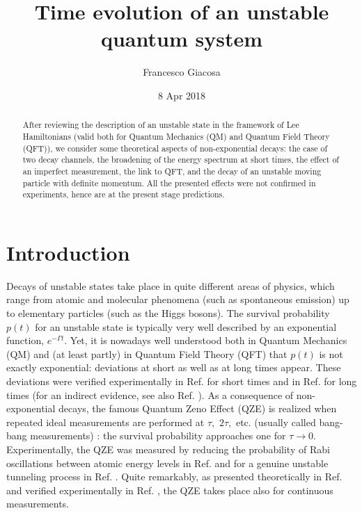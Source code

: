 \documentclass[12pt]{article}%
\begin{document}
\title{Time evolution of an unstable quantum system}
\author{Francesco Giacosa}
\date{8 Apr 2018}
\maketitle

\begin{abstract}
After reviewing the description of an unstable state in the framework of Lee
Hamiltonians (valid both for Quantum Mechanics (QM) and Quantum Field Theory
(QFT)), we consider some theoretical aspects of non-exponential decays: the
case of two decay channels, the broadening of the energy spectrum at short
times, the effect of an imperfect measurement, the link to QFT, and the decay
of an unstable moving particle with definite momentum. All the presented
effects were not confirmed in experiments, hence are at the present stage predictions.

\end{abstract}



\section{Introduction}

Decays of unstable states take place in quite different areas of physics,
which range from atomic and molecular phenomena (such as spontaneous emission)
up to elementary particles (such as the Higgs bosons). The survival
probability $p(t)$ for an unstable state is typically very well described by
an exponential function, $e^{-\Gamma t}$. Yet, it is nowadays well understood
both in Quantum Mechanics (QM) \cite{khalfin,ghirardi} and (at least partly)
in Quantum Field Theory (QFT) \cite{zenoqft,duecan} that $p(t)$ is not exactly
exponential: deviations at short as well as at long times appear. These
deviations were verified experimentally in Ref. \cite{raizen1} for short times
and in Ref. \cite{rothe} for long times (for an indirect evidence, see also
Ref. \cite{kelkar}). As a consequence of non-exponential decays, the famous
Quantum Zeno Effect (QZE) is realized when repeated ideal measurements are
performed at $\tau,$ $2\tau,$ etc. (usually called bang-bang measurements)
\cite{dega,misra,facchiprl,shimizu}: the survival probability approaches one
for $\tau\rightarrow0$. Experimentally, the QZE was measured by reducing the
probability of Rabi oscillations between atomic energy levels in Ref.
\cite{itano,balzer} and for a genuine unstable tunneling process in Ref.
\cite{raizen2}. Quite remarkably, as presented theoretically in Ref.
\cite{schulman} and verified experimentally in Ref. \cite{ketterle}, the QZE
takes place also for continuous measurements.
\end{document}
